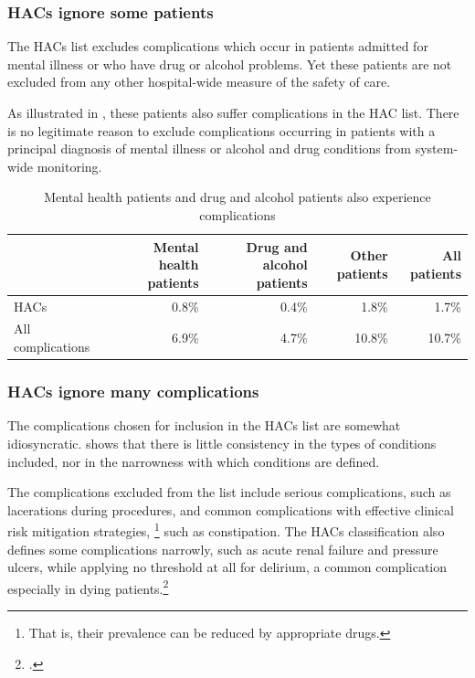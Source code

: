 \documentclass[FrontPage]{grattan}
\begin{document}
\subsubsection{HACs ignore some patients}\label{subsubsec:hacs-ignore-some-patients}

The HACs list excludes complications which occur in patients admitted for mental illness or who have drug or alcohol problems.
Yet these patients are not excluded from any other hospital-wide measure of the safety of care.

As illustrated in , these patients also suffer complications in the HAC list. There is no legitimate reason to exclude complications occurring in patients with a principal diagnosis of mental illness or alcohol and drug conditions from system-wide monitoring.

\begin{table}
\caption{Mental health patients and drug and alcohol patients also experience complications}\label{tbl:mental-health-patients-also-experience-complications}

\begin{tabularx}{\linewidth}{lRRRR}
\toprule
                  & Mental health patients & Drug and alcohol patients & Other patients & All patients\tabularnewline
\midrule
HACs              & 0.8\%                  & 0.4\%                     & 1.8\%          & 1.7\%\tabularnewline
All complications & 6.9\%                    & 4.7\%                       & 10.8\%         & 10.7\%\tabularnewline
\bottomrule
\end{tabularx}
\end{table}

\subsubsection{HACs ignore many complications}\label{subsubsec:hacs-ignore-many-complications}

The complications chosen for inclusion in the HACs list are somewhat idiosyncratic.
 shows that there is little consistency in the types of conditions included, nor in the narrowness with which conditions are defined.

The complications excluded from the list include serious complications, such as lacerations during procedures, and common complications with effective clinical risk mitigation strategies,%
	\footnote{That is, their prevalence can be reduced by appropriate drugs.}
such as constipation.
The HACs classification also defines some complications narrowly, such as acute renal failure and pressure ulcers, while applying no threshold at all for delirium, a common complication especially in dying patients.\footcites{oregan2013delirium}{hosie2013delirium}{grassi2015management}
\end{document}
